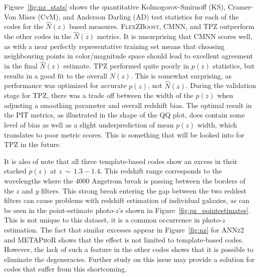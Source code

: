 \documentclass[usenatbib]{mn2e}
\newcommand{\red}[1]{\textcolor{red}{#1}}
\begin{document}
Figure~\ref{fig:nz_stats} shows the quantitative Kolmogorov-Smirnoff (KS), Cramer-Von Mises (CvM), and Anderson Darling (AD) test statistics for each of the codes for the $\hat{N}(z)$ based measures.
\textsc{FlexZBoost}, \textsc{CMNN}, and \textsc{TPZ} outperform the other codes in the $\hat{N}(z)$ metrics.  
It is unsurprising that \textsc{CMNN} scores well, as with a near perfectly representative training set means that choosing neighbouring points in color/magnitude space should lead to excellent agreement in the final $\hat{N}(z)$ estimate.  \textsc{TPZ} performed quite poorly in $p(z)$ statistics, but results in a good fit to the overall $N(z)$.  This is somewhat surprising, as performance was optimized for accurate $p(z)$, not $\hat{N}(z)$.  During the validation stage for \textsc{TPZ}, there was a trade off between the width of the $p(z)$ when adjusting a smoothing parameter and overall redshift bias.  The optimal result in the PIT metrics, as illustrated in the shape of the QQ plot, does contain some level of bias as well as a slight underprediction of mean $p(z)$ width, which translates to poor metric scores.  This is something that will be looked into for \textsc{TPZ} in the future.

It is also of note that all three template-based codes show an excess in their stacked $p(z)$ at $z\,\sim\,1.3-1.4$.  This redshift range corresponds to the wavelengths where the $4000$ Angstrom break is passing between the borders of the $z$ and $y$ filters.  This strong break entering the gap between the two reddest filters can cause problems with redshift estimation of individual galaxies, as can be seen in the point-estimate photo-$z$'s shown in Figure~\ref{fig:pz_pointestimates}.  This is not unique to this dataset, it is a common occurrence in photo-$z$ estimation.  The fact that similar excesses appear in Figure~\ref{fig:nz} for \textsc{ANNz2} and \textsc{METAPhoR} shows that the effect is not limited to template-based codes.  However, the lack of such a feature in the other codes shows that it is possible to eliminate the degeneracies.  Further study on this issue may provide a solution for codes that suffer from this shortcoming.


\end{document}
